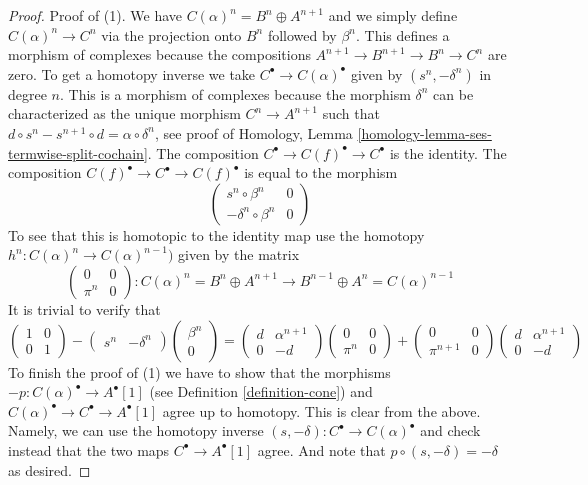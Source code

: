 \begin{proof}
Proof of (1). We have $C(\alpha)^n = B^n \oplus A^{n + 1}$
and we simply define $C(\alpha)^n \to C^n$ via the projection
onto $B^n$ followed by $\beta^n$. This defines
a morphism of complexes because the compositions
$A^{n + 1} \to B^{n + 1} \to B^n \to C^n$ are zero.
To get a homotopy inverse we take
$C^\bullet \to C(\alpha)^\bullet$ given by
$(s^n , -\delta^n)$ in degree $n$. This is a morphism of complexes
because the morphism $\delta^n$ can be characterized as the
unique morphism $C^n \to A^{n + 1}$ such that
$d \circ s^n - s^{n + 1} \circ d = \alpha \circ \delta^n$,
see proof of
Homology, Lemma \ref{homology-lemma-ses-termwise-split-cochain}.
The composition
$C^\bullet \to C(f)^\bullet \to C^\bullet$ is the identity.
The composition $C(f)^\bullet \to C^\bullet \to C(f)^\bullet$
is equal to the morphism
$$
\left(
\begin{matrix}
s^n \circ \beta^n & 0 \\
-\delta^n \circ \beta^n & 0
\end{matrix}
\right)
$$
To see that this is homotopic to the identity map
use the homotopy $h^n : C(\alpha)^n \to C(\alpha)^{n - 1})$
given by the matrix
$$
\left(
\begin{matrix}
0 & 0 \\
\pi^n & 0
\end{matrix}
\right) : C(\alpha)^n = B^n \oplus A^{n + 1} \to
B^{n - 1} \oplus A^n = C(\alpha)^{n - 1}
$$
It is trivial to verify that
$$
\left(
\begin{matrix}
1 & 0 \\
0 & 1
\end{matrix}
\right)
-
\left(
\begin{matrix}
s^n &
-\delta^n
\end{matrix}
\right)
\left(
\begin{matrix}
\beta^n \\
0
\end{matrix}
\right)
=
\left(
\begin{matrix}
d & \alpha^{n + 1} \\
0 & -d
\end{matrix}
\right)
\left(
\begin{matrix}
0 & 0 \\
\pi^n & 0
\end{matrix}
\right)
+
\left(
\begin{matrix}
0 & 0 \\
\pi^{n + 1} & 0
\end{matrix}
\right)
\left(
\begin{matrix}
d & \alpha^{n + 1} \\
0 & -d
\end{matrix}
\right)
$$
To finish the proof of (1) we have to show that the morphisms
$-p : C(\alpha)^\bullet \to A^\bullet[1]$ (see
Definition \ref{definition-cone})
and  $C(\alpha)^\bullet \to C^\bullet \to A^\bullet[1]$ agree up
to homotopy. This is clear from the above. Namely, we can use the homotopy
inverse $(s, -\delta) : C^\bullet \to C(\alpha)^\bullet$
and check instead that the two maps
$C^\bullet \to A^\bullet[1]$ agree. And note that
$p \circ (s, -\delta) = -\delta$ as desired.


\end{proof}
